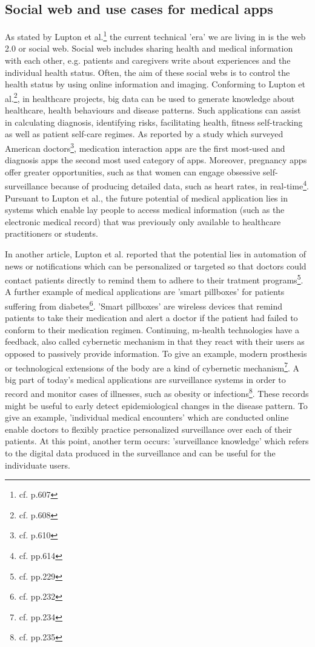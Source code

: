 \subsection{Social web and use cases for medical apps}
As stated by Lupton et al.\footnote{cf.\autocite{lupton_apps} p.607} the current technical 'era' we are living in is the web 2.0 or social web. Social web includes sharing health and medical information with each other, e.g. patients and caregivers write about experiences and the individual health status. Often, the aim of these social webs is to control the health status by using online information and imaging.
Conforming to Lupton et al.\footnote{cf.\autocite{lupton_apps} p.608}, in healthcare projects, big data can be used to generate knowledge about healthcare, health behaviours and disease patterns. Such applications can assist in calculating diagnosis, identifying risks, facilitating health, fitness self-tracking as well as patient self-care regimes.
As reported by a study which surveyed American doctors\footnote{cf.\autocite{lupton_apps} p.610}, medication interaction apps are the first most-used and diagnosis apps the second most used category of apps.
Moreover, pregnancy apps offer greater opportunities, such as that women can engage obsessive self-surveillance because of producing detailed data, such as heart rates, in real-time\footnote{cf.\autocite{lupton_apps} pp.614}. Pursuant to Lupton et al., the future potential of medical application lies in systems which enable lay people to access medical information (such as the electronic medical record) that was previously only available to healthcare practitioners or students.

In another article, Lupton et al. reported that the potential lies in automation of news or notifications which can be personalized or targeted so that doctors could contact patients directly to remind them to adhere to their tratment programs\footnote{cf.\autocite{lupton_mhealth} pp.229}.
A further example of medical applications are 'smart pillboxes' for patients suffering from diabetes\footnote{cf.\autocite{lupton_mhealth} pp.232}. 'Smart pillboxes' are wireless devices that remind patients to take their medication and alert a doctor if the patient had failed to conform to their medication regimen.
Continuing, \ac{m-health} technologies have a feedback, also called cybernetic mechanism in that they react with their users as opposed to passively provide information. To give an example, modern prosthesis or technological extensions of the body are a kind of cybernetic mechanism\footnote{cf.\autocite{lupton_mhealth} pp.234}. 
A big part of today's medical applications are surveillance systems in order to record and monitor cases of illnesses, such as obesity or infections\footnote{cf.\autocite{lupton_mhealth} pp.235}. These records might be useful to early detect epidemiological changes in the disease pattern. To give an example, 'individual medical encounters' which are conducted online enable doctors to flexibly practice personalized surveillance over each of their patients. At this point, another term occurs: 'surveillance knowledge' which refers to the digital data produced in the surveillance and can be useful for the individuate users.

